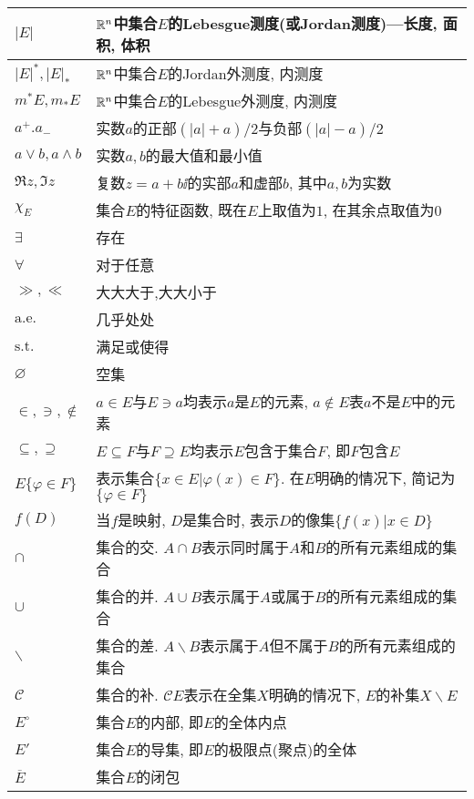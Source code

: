 \begin{longtable}{ll}
\(|E|\)&\(\mathbb{R}^n\)中集合\(E\)的Lebesgue测度(或Jordan测度)---长度, 面积, 体积\\\hline
\(|E|^*,|E|_*\)&\(\mathbb{R}^n\)中集合\(E\)的Jordan外测度, 内测度\\\hline
\(m^*E,m_*E\)&\(\mathbb{R}^n\)中集合\(E\)的Lebesgue外测度, 内测度\\\hline
\(a^+.a_-\)&实数\(a\)的正部\(\left(|a|+a\right)/2\)与负部\(\left(|a|-a\right)/2\)\\\hline
\(a\vee b,a\wedge b\)&实数\(a,b\)的最大值和最小值\\\hline
\(\Re z,\Im z\)&复数\(z=a+b\ii\)的实部\(a\)和虚部\(b\), 其中\(a,b\)为实数\\\hline
\(\chi_E\)&集合\(E\)的特征函数, 既在\(E\)上取值为\(1\), 在其余点取值为\(0\)\\\hline
\(\exists\)&存在\\\hline
\(\forall\)&对于任意\\\hline
\(\gg,\ll\)&大大大于,大大小于\\\hline
\(\mathrm{a.e.}\)&几乎处处\\\hline
\(\mathrm{s.t.}\)&满足或使得\\\hline
\(\varnothing\)&空集\\\hline
\(\in,\ni,\notin\)&\(a\in E\)与\(E\ni a\)均表示\(a\)是\(E\)的元素, \(a\notin E\)表\(a\)不是\(E\)中的元素\\\hline
\(\subseteq,\supseteq\)&\(E\subseteq F\)与\(F\supseteq E\)均表示\(E\)包含于集合\(F\), 即\(F\)包含\(E\)\\\hline
\(E\{\varphi\in F\}\)&表示集合\(\{x\in E\big|\varphi(x)\in F\}\). 在\(E\)明确的情况下, 简记为\(\{\varphi\in F\}\)\\\hline
\(f(D)\)&当\(f\)是映射, \(D\)是集合时, 表示\(D\)的像集\(\{f(x)\big|x\in D\}\)\\\hline
\(\cap\)&集合的交. \(A\cap B\)表示同时属于\(A\)和\(B\)的所有元素组成的集合\\\hline
\(\cup\)&集合的并. \(A\cup B\)表示属于\(A\)或属于\(B\)的所有元素组成的集合\\\hline
\(\backslash\)&集合的差. \(A\backslash B\)表示属于\(A\)但不属于\(B\)的所有元素组成的集合\\\hline
\(\mathscr{C}\)&集合的补. \(\mathscr{C}E\)表示在全集\(X\)明确的情况下, \(E\)的补集\(X\backslash E\)\\\hline
\(E^{\circ}\)&集合\(E\)的内部, 即\(E\)的全体内点\\\hline
\(E'\)&集合\(E\)的导集, 即\(E\)的极限点(聚点)的全体\\\hline
\(\overline{E}\)&集合\(E\)的闭包\\\hline

\end{longtable}
